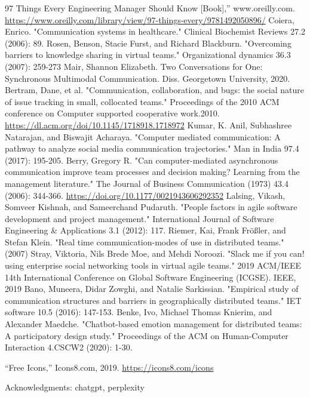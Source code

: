 \documentclass{llncs}
\begin{document}
\begin{thebibliography}{8}
97 Things Every Engineering Manager Should Know [Book],” www.oreilly.com.
\url{https://www.oreilly.com/library/view/97-things-every/9781492050896/}
‌
Coiera, Enrico. "Communication systems in healthcare." Clinical Biochemist Reviews 27.2 (2006): 89.
Rosen, Benson, Stacie Furst, and Richard Blackburn. "Overcoming barriers to knowledge sharing in virtual teams." Organizational dynamics 36.3 (2007): 259-273
Mair, Shannon Elizabeth. Two Conversations for One: Synchronous Multimodal Communication. Diss. Georgetown University, 2020.
Bertram, Dane, et al. "Communication, collaboration, and bugs: the social nature of issue tracking in small, collocated teams." Proceedings of the 2010 ACM conference on Computer supported cooperative work.2010. \url{https://dl.acm.org/doi/10.1145/1718918.1718972}
Kumar, K. Anil, Subhashree Natarajan, and Biswajit Acharaya. "Computer mediated communication: A pathway to analyze social media communication trajectories." Man in India 97.4 (2017): 195-205.
Berry, Gregory R. "Can computer-mediated asynchronous communication improve team processes and decision making? Learning from the management literature." The Journal of Business Communication (1973) 43.4 (2006): 344-366. \url{https://doi.org/10.1177/0021943606292352}
Lalsing, Vikash, Somveer Kishnah, and Sameerchand Pudaruth. "People factors in agile software development and project management." International Journal of Software Engineering \& Applications 3.1 (2012): 117.
Riemer, Kai, Frank Frößler, and Stefan Klein. "Real time communication-modes of use in distributed teams." (2007)
Stray, Viktoria, Nils Brede Moe, and Mehdi Noroozi. "Slack me if you can! using enterprise social networking tools in virtual agile teams." 2019 ACM/IEEE 14th International Conference on Global Software Engineering (ICGSE). IEEE, 2019
Bano, Muneera, Didar Zowghi, and Natalie Sarkissian. "Empirical study of communication structures and barriers in geographically distributed teams." IET software 10.5 (2016): 147-153.
Benke, Ivo, Michael Thomas Knierim, and Alexander Maedche. "Chatbot-based emotion management for distributed teams: A participatory design study." Proceedings of the ACM on Human-Computer Interaction 4.CSCW2 (2020): 1-30.

“Free Icons,” Icons8.com, 2019. \url{https://icons8.com/icons}

Acknowledgments: chatgpt, perplexity
\end{thebibliography}
\end{document}

